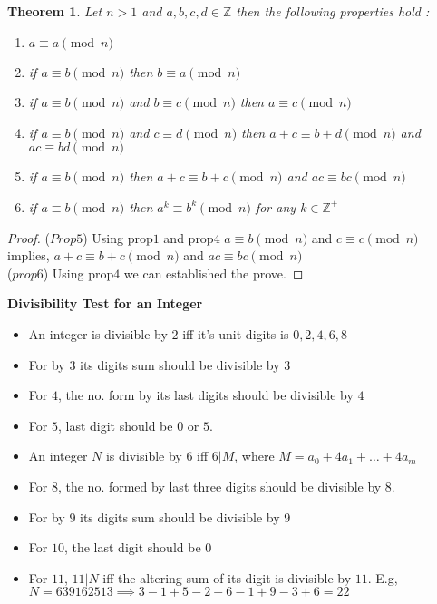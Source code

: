 \documentclass[12pt,a4paper]{article}
\newcommand{\Z}{\mathbb{Z}}
\newtheorem{thm}{Theorem}
\begin{document}
\begin{thm}
	Let $n>1$ and $a,b,c,d \in \Z$ then the following properties hold :
	\begin{enumerate}
		\item $a \equiv a \pmod n$
		\item if  $a \equiv b \pmod n$ then  $b \equiv a \pmod n$
		\item if  $a \equiv b \pmod n$ and  $b \equiv c \pmod n$ then  $a \equiv c \pmod n$
		\item if  $a \equiv b \pmod n$ and  $c \equiv d \pmod n$ then  $a+c \equiv b+d \pmod n$ and  $ac \equiv bd \pmod n$
		\item  if $a \equiv b \pmod n$ then  $a+c \equiv b+c \pmod n$ and  $ac \equiv bc \pmod n$
		\item if  $a \equiv b \pmod n$ then  $a^{k} \equiv b^{k} \pmod n$ for any $k \in \Z^{+}$
	\end{enumerate}	
\end{thm}

\begin{proof}
	($Prop 5$) Using prop$1$ and prop$4$ $a \equiv b \pmod n$ and $ c \equiv c \pmod n$ implies, $a+c \equiv b+c \pmod n$ and $ac \equiv bc \pmod n$ \\
	($prop 6$) Using prop$4$ we can established the prove.
\end{proof}

\textbf{Divisibility Test for an Integer}
\begin{itemize}
	\item An integer is divisible by $2$ iff it's unit digits is $0,2,4,6,8$
	\item For by $3$ its digits sum should be divisible by $3$
	\item For $4$, the no. form by its last digits should be divisible by $4$
	\item For $5$, last digit should be $0$ or $5$.
	\item An integer $N$ is divisible by $6$ iff $6|M$, where $M = a_{0}+4a_{1}+\dots +4a_{m}$
	\item For $8$, the no. formed by last three digits should be divisible by $8$. 
	\item For by $9$ its digits sum should be divisible by $9$
	\item For $10$, the last digit should be $0$
	\item For $11$, $11|N$ iff the altering sum of its digit is divisible by $11$. E.g, $N=639162513 \implies 3-1+5-2+6-1+9-3+6=22$
\end{itemize}
\end{document}
